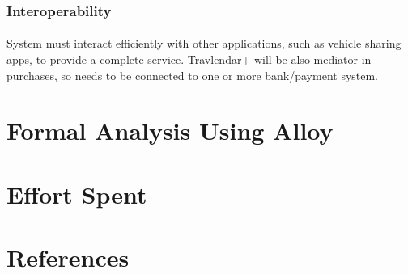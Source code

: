 \documentclass{article}
\begin{document}
\subsubsection{Interoperability}
\paragraph{}
System must interact efficiently with other applications, such as vehicle sharing apps, to provide a complete service. Travlendar+ will be also mediator in purchases, so needs to be connected to one or more bank/payment system.
\section{Formal Analysis Using Alloy}
\newpage
\section{Effort Spent}
\section{References}
\end{document}
